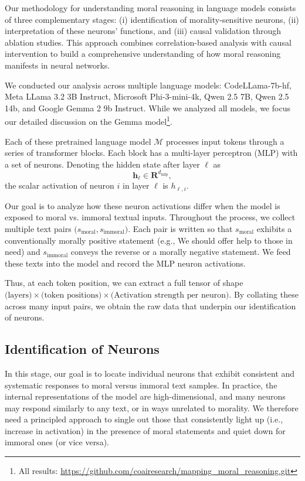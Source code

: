 \documentclass[runninghheads]{llncs}
\begin{document}
Our methodology for understanding moral reasoning in language models consists of three complementary stages: (i) identification of morality-sensitive neurons, (ii) interpretation of these neurons' functions, and (iii) causal validation through ablation studies. This approach combines correlation-based analysis with causal intervention to build a comprehensive understanding of how moral reasoning manifests in neural networks.

We conducted our analysis across multiple language models: CodeLLama-7b-hf, Meta LLama 3.2 3B Instruct, Microsoft Phi-3-mini-4k, Qwen 2.5 7B, Qwen 2.5 14b, and Google Gemma 2 9b Instruct. While we analyzed all models, we focus our detailed discussion on the Gemma model\footnote{All results: \href{https://github.com/coairesearch/mapping_moral_reasoning.git}{https://github.com/coairesearch/mapping\_moral\_reasoning.git}}.

Each of these pretrained language model \(\mathcal{M}\)  processes input tokens through a series of transformer blocks. Each block has a multi-layer perceptron (MLP) with a set of neurons. Denoting the hidden state after layer \(\ell\)  as \[
\mathbf{h}_{\ell} \in \mathbf{R}^{d_{\text{mlp}}}, 
\]
the scalar activation of neuron \(i\) in layer \(\ell\) is \(h_{\ell, i}\). 


Our goal is to analyze how these neuron activations differ when the model is exposed to moral vs. immoral textual inputs. Throughout the process, we collect multiple text pairs \(\bigl(s_{\mathrm{moral}}, s_{\mathrm{immoral}}\bigr)\). Each pair is written so that \(s_{\mathrm{moral}}\) exhibits a conventionally morally positive statement (e.g., We should offer help to those in need) and \(s_{\mathrm{immoral}}\) conveys the reverse or a morally negative statement. We feed these texts into the model and record the MLP neuron activations.

Thus, at each token position, we can extract a full tensor of shape \(\text{(layers)} \times \text{(token positions)} \times \text{(Activation strength per neuron)}\). By collating these across many input pairs, we obtain the raw data that underpin our identification of neurons.

\subsection{Identification of Neurons}

In this stage, our goal is to locate individual neurons that exhibit consistent and systematic responses to moral versus immoral text samples. In practice, the internal representations of the model are high-dimensional, and many neurons may respond similarly to any text, or in ways unrelated to morality. We therefore need a principled approach to single out those that consistently light up (i.e., increase in activation) in the presence of moral statements and quiet down for immoral ones (or vice versa).
\end{document}
